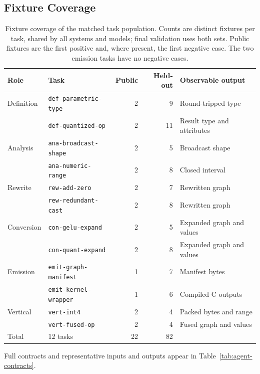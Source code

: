 \subsection{Fixture Coverage}
\begin{table}[H]
\caption{Fixture coverage of the matched task population. Counts are distinct
fixtures per task, shared by all systems and models; final validation uses both
sets. Public fixtures are the first positive and, where present, the first
negative case. The two emission tasks have no negative cases.}
\label{tab:extension-coverage}
\centering
\scriptsize
\setlength{\tabcolsep}{3pt}
\begin{tabular*}{\textwidth}{@{\extracolsep{\fill}}llrrl@{}}
\toprule
Role & Task & Public & Held-out & Observable output \\
\midrule
Definition & \texttt{def-parametric-type} & 2 & 9 & Round-tripped type \\
 & \texttt{def-quantized-op} & 2 & 11 & Result type and attributes \\
\addlinespace[2pt]
Analysis & \texttt{ana-broadcast-shape} & 2 & 5 & Broadcast shape \\
 & \texttt{ana-numeric-range} & 2 & 8 & Closed interval \\
\addlinespace[2pt]
Rewrite & \texttt{rew-add-zero} & 2 & 7 & Rewritten graph \\
 & \texttt{rew-redundant-cast} & 2 & 8 & Rewritten graph \\
\addlinespace[2pt]
Conversion & \texttt{con-gelu-expand} & 2 & 5 & Expanded graph and values \\
 & \texttt{con-quant-expand} & 2 & 8 & Expanded graph and values \\
\addlinespace[2pt]
Emission & \texttt{emit-graph-manifest} & 1 & 7 & Manifest bytes \\
 & \texttt{emit-kernel-wrapper} & 1 & 6 & Compiled C outputs \\
\addlinespace[2pt]
Vertical & \texttt{vert-int4} & 2 & 4 & Packed bytes and range \\
 & \texttt{vert-fused-op} & 2 & 4 & Fused graph and values \\
\midrule
Total & 12 tasks & 22 & 82 & \\
\bottomrule
\end{tabular*}
\par\smallskip\raggedright
Full contracts and representative inputs and outputs appear in
Table~\ref{tab:agent-contracts}.
\end{table}

